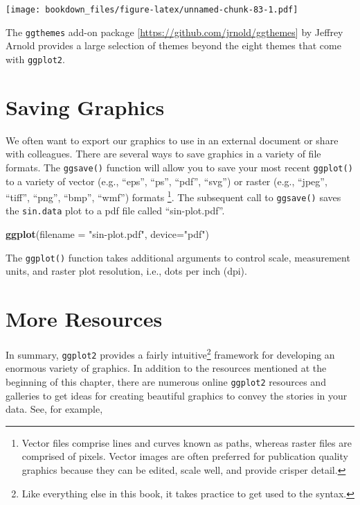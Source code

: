 \documentclass[]{krantz}
\makeatletter
\newenvironment{Shaded}{\begin{snugshade}}{\end{snugshade}}
\newcommand{\KeywordTok}[1]{\textcolor[rgb]{0.27,0.27,0.27}{\textbf{#1}}}
\newcommand{\DataTypeTok}[1]{\textcolor[rgb]{0.27,0.27,0.27}{#1}}
\newcommand{\StringTok}[1]{\textcolor[rgb]{0.5,0.5,0.5}{#1}}
\newcommand{\NormalTok}[1]{#1}
\newenvironment{kframe}{%
\medskip{}
\setlength{\fboxsep}{.8em}
 \def\at@end@of@kframe{}%
 \ifinner\ifhmode%
  \def\at@end@of@kframe{\end{minipage}}%
  \begin{minipage}{\columnwidth}%
 \fi\fi%
 \def\FrameCommand##1{\hskip\@totalleftmargin \hskip-\fboxsep
 \colorbox{shadecolor}{##1}\hskip-\fboxsep
     \hskip-\linewidth \hskip-\@totalleftmargin \hskip\columnwidth}%
 \MakeFramed {\advance\hsize-\width
   \@totalleftmargin\z@ \linewidth\hsize
   \@setminipage}}%
 {\par\unskip\endMakeFramed%
 \at@end@of@kframe}
\renewenvironment{Shaded}{\begin{kframe}}{\end{kframe}}
\makeatother
\begin{document}
\texttt{[image: bookdown\_files/figure-latex/unnamed-chunk-83-1.pdf]}

The \texttt{ggthemes} add-on package
{[}\url{https://github.com/jrnold/ggthemes}{]} by Jeffrey Arnold
provides a large selection of themes beyond the eight themes that come
with \texttt{ggplot2}.

\section{Saving Graphics}\label{saving-graphics}

We often want to export our graphics to use in an external document or
share with colleagues. There are several ways to save graphics in a
variety of file formats. The \texttt{ggsave()} function will allow you
to save your most recent \texttt{ggplot()} to a variety of vector (e.g.,
``eps'', ``ps'', ``pdf'', ``svg'') or raster (e.g., ``jpeg'', ``tiff'',
``png'', ``bmp'', ``wmf'') formats \footnote{Vector files comprise lines
  and curves known as paths, whereas raster files are comprised of
  pixels. Vector images are often preferred for publication quality
  graphics because they can be edited, scale well, and provide crisper
  detail.}. The subsequent call to \texttt{ggsave()} saves the
\texttt{sin.data} plot to a pdf file called ``sin-plot.pdf''.

\begin{Shaded}
\begin{Highlighting}[]
\KeywordTok{ggplot}\NormalTok{(}\DataTypeTok{filename =} \StringTok{"sin-plot.pdf"}\NormalTok{, }\DataTypeTok{device=}\StringTok{"pdf"}\NormalTok{)}
\end{Highlighting}
\end{Shaded}

The \texttt{ggplot()} function takes additional arguments to control
scale, measurement units, and raster plot resolution, i.e., dots per
inch (dpi).

\section{More Resources}\label{more-resources}

In summary, \texttt{ggplot2} provides a fairly intuitive\footnote{Like
  everything else in this book, it takes practice to get used to the
  syntax.} framework for developing an enormous variety of graphics. In
addition to the resources mentioned at the beginning of this chapter,
there are numerous online \texttt{ggplot2} resources and galleries to
get ideas for creating beautiful graphics to convey the stories in your
data. See, for example,
\end{document}
